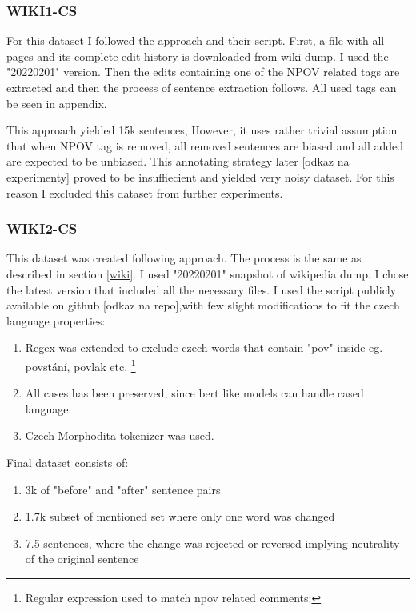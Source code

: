 \subsubsection{WIKI1-CS}
For this dataset I followed the \cite{aleksandrova2019multilingual} approach and their script. First, a file with all pages and its complete edit history is downloaded from wiki dump. I used the "20220201" version. Then the edits containing one of the NPOV related tags are extracted and then the process of sentence extraction follows. All used tags can be seen in appendix.

This approach yielded 15k sentences, However, it uses rather trivial assumption that when NPOV tag is removed, all removed sentences are biased and all added are expected to be unbiased. This annotating strategy later [odkaz na experimenty] proved to be insuffiecient and yielded very noisy dataset. For this reason I excluded this dataset from further experiments.

\subsubsection{WIKI2-CS}\label{wncs}
This dataset was created following \cite{pryzant2020automatically} approach. The process is the same as described in section \ref{wiki}. I used "20220201" snapshot of wikipedia dump. I chose the latest version that included all the necessary files.
I used the script publicly available on github [odkaz na repo],with few slight modifications to fit the czech language properties:
\begin{enumerate}
    \item Regex was extended to exclude czech words that contain "pov" inside eg. povstání, povlak etc. \footnote{Regular expression used to match npov related comments: }
    \item All cases has been preserved, since bert like models can handle cased language.
    \item Czech Morphodita tokenizer was used.
\end{enumerate}
\newpage
Final dataset consists of:
\begin{enumerate}
    \item 3k of "before" and "after" sentence pairs
    \item 1.7k subset of mentioned set where only one word was changed
    \item 7.5 sentences, where the change was rejected or reversed implying neutrality of the original sentence
\end{enumerate}

